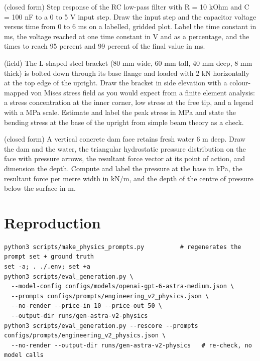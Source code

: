 \documentclass[11pt,a4paper]{article}
\begin{document}
\begin{description}[style=nextline,leftmargin=1em]
\item[\texttt{rc\_step\_response}] (closed form) Step response of the RC low-pass filter with R = 10 kOhm and C = 100 nF to a 0 to 5 V input step. Draw the input step and the capacitor voltage versus time from 0 to 6 ms on a labelled, gridded plot. Label the time constant in ms, the voltage reached at one time constant in V and as a percentage, and the times to reach 95 percent and 99 percent of the final value in ms.
\item[\texttt{lbracket\_von\_mises}] (field) The L-shaped steel bracket (80 mm wide, 60 mm tall, 40 mm deep, 8 mm thick) is bolted down through its base flange and loaded with 2 kN horizontally at the top edge of the upright. Draw the bracket in side elevation with a colour-mapped von Mises stress field as you would expect from a finite element analysis: a stress concentration at the inner corner, low stress at the free tip, and a legend with a MPa scale. Estimate and label the peak stress in MPa and state the bending stress at the base of the upright from simple beam theory as a check.
\item[\texttt{dam\_hydrostatic}] (closed form) A vertical concrete dam face retains fresh water 6 m deep. Draw the dam and the water, the triangular hydrostatic pressure distribution on the face with pressure arrows, the resultant force vector at its point of action, and dimension the depth. Compute and label the pressure at the base in kPa, the resultant force per metre width in kN/m, and the depth of the centre of pressure below the surface in m.
\end{description}

\section{Reproduction}
{\footnotesize
\begin{verbatim}
python3 scripts/make_physics_prompts.py          # regenerates the prompt set + ground truth
set -a; . ./.env; set +a
python3 scripts/eval_generation.py \
  --model-config configs/models/openai-gpt-6-astra-medium.json \
  --prompts configs/prompts/engineering_v2_physics.json \
  --no-render --price-in 10 --price-out 50 \
  --output-dir runs/gen-astra-v2-physics
python3 scripts/eval_generation.py --rescore --prompts configs/prompts/engineering_v2_physics.json \
  --no-render --output-dir runs/gen-astra-v2-physics   # re-check, no model calls
\end{verbatim}
}
\end{document}
